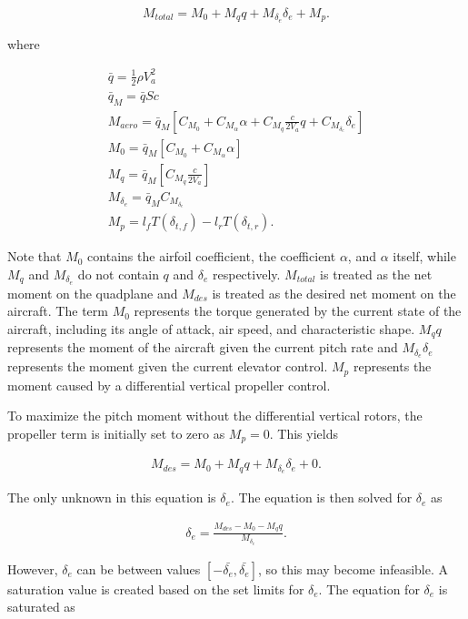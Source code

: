 \begin{equation}
    \label{eq:MomentsSum}
    M_{total} = M_0 + M_q q + M_{\delta_e} \delta_e + M_p.
\end{equation}

where

\begin{align}
    \bar{q} = \frac{1}{2} \rho V_a^2\\
    \bar{q}_M = \bar{q} S c\\
    M_{aero} = \bar{q}_M \left[C_{M_0} + C_{M_{\alpha}} \alpha + C_{M_q} \frac{c}{2V_a} q + C_{M_{\delta_e}} \delta_e \right] \\
    M_0 = \bar{q}_M \left[C_{M_0} + C_{M_{\alpha}} \alpha \right]\\
    M_q = \bar{q}_M \left[ C_{M_q} \frac{c}{2V_a} \right]\\
    M_{\delta_e} = \bar{q}_M C_{M_{\delta_e}}\\
    M_p = l_f T(\delta_{t,f}) - l_r T(\delta_{t,r}).
\end{align}

Note that $M_0$ contains the airfoil coefficient, the coefficient $\alpha$, and $\alpha$ itself, while $M_q$ and $M_{\delta_e}$ do not contain $q$ and $\delta_e$ respectively. 
$M_{total}$ is treated as the net moment on the quadplane and $M_{des}$ is treated as the desired net moment on the aircraft. 
The term $M_0$ represents the torque generated by the current state of the aircraft, including its angle of attack, air speed, and characteristic shape. 
$M_q q$ represents the moment of the aircraft given the current pitch rate and $M_{\delta_e} \delta_e$ represents the moment given the current elevator control.
$M_p$ represents the moment caused by a differential vertical propeller control.

To maximize the pitch moment without the differential vertical rotors, the propeller term is initially set to zero as $M_p = 0$. 
This yields

\begin{align}
    \label{eq:momentsSum}
    M_{des} = M_0 + M_q q + M_{\delta_e} \delta_e + 0.
\end{align}

The only unknown in this equation is $\delta_e$.
The equation is then solved for $\delta_e$ as

\begin{align}
    \delta_e = \frac{M_{des} - M_0 - M_q q }{M_{\delta_e}}.
\end{align}

However, $\delta_e$ can be between values $[-\bar{\delta_e},\bar{\delta_e}]$, so this may become infeasible. 
A saturation value is created based on the set limits for $\delta_e$.
The equation for $\delta_e$ is saturated as

